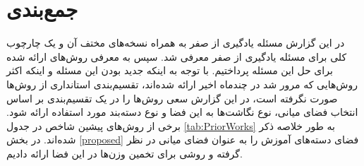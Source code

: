 \section{جمع‌بندی}\label{conclusion}
در این گزارش مسئله یادگیری از صفر به همراه نسخه‌های مختف آن و یک چارچوب کلی برای مسئله یادگیری از صفر معرفی شد. سپس به معرفی روش‌های ارائه شده برای حل این مسئله پرداختیم. با توجه به اینکه جدید بودن این مسئله و اینکه اکثر روش‌هایی که مرور شد در چندماه اخیر ارائه شده‌اند، تقسیم‌بندی استانداری از روش‌ها صورت نگرفته است، در این گزارش سعی روش‌ها را در یک تقسیم‌بندی بر اساس انتخاب فضای میانی، نوع نگاشت‌ها به این فضا و نوع دسته‌بند مورد استفاده ارائه شود. برخی از روش‌های پیشین شاخص در جدول  \ref{tab:PriorWorks} به طور خلاصه ذکر شده‌اند. در بخش \ref{proposed} فضای دسته‌های آموزش را به عنوان فضای میانی در نظر گرفته و روشی برای تخمین وزن‌ها در این فضا ارائه دادیم. 

